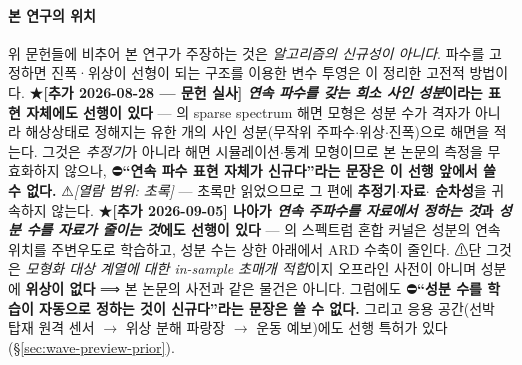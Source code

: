 \documentclass[11pt]{report}
\numberwithin{equation}{chapter}
\numberwithin{figure}{chapter}
\numberwithin{table}{chapter}
\begin{document}
\paragraph{본 연구의 위치}
위 문헌들에 비추어 본 연구가 주장하는 것은 \emph{알고리즘의 신규성이 아니다}.
파수를 고정하면 진폭·위상이 선형이 되는 구조를 이용한 변수 투영은
\citet{GolubPereyra2003}이 정리한 고전적 방법이다.
★\textbf{[추가 2026-08-28 --- 문헌 실사] \emph{연속 파수를 갖는 희소 사인 성분}이라는
표현 자체에도 선행이 있다} --- \citet{Charnotskii2011SparseSpectrum} 의 sparse spectrum
해면 모형은 성분 수가 격자가 아니라 해상상태로 정해지는 유한 개의 사인 성분(무작위
주파수$\cdot$위상$\cdot$진폭)으로 해면을 적는다. 그것은 \emph{추정기}가 아니라 해면
시뮬레이션$\cdot$통계 모형이므로 본 논문의 측정을 무효화하지 않으나,
⛔\textbf{``연속 파수 표현 자체가 신규다''라는 문장은 이 선행 앞에서 쓸 수 없다.}
⚠\emph{[열람 범위: 초록]} --- 초록만 읽었으므로 그 편에 \textbf{추정기$\cdot$자료$\cdot$
순차성}을 귀속하지 않는다.
★\textbf{[추가 2026-09-05] 나아가 \emph{연속 주파수를 자료에서 정하는 것}과
\emph{성분 수를 자료가 줄이는 것}에도 선행이 있다} --- \citet{WilsonAdams2013} 의 스펙트럼
혼합 커널은 성분의 연속 위치를 주변우도로 학습하고, 성분 수는 상한 아래에서 ARD 수축이
줄인다. ⚠단 그것은 \emph{모형화 대상 계열에 대한 in-sample 초매개 적합}이지 오프라인
사전이 아니며 성분에 \textbf{위상이 없다} ⟹ 본 논문의 사전과 같은 물건은 아니다.
그럼에도 ⛔\textbf{``성분 수를 학습이 자동으로 정하는 것이 신규다''라는 문장은 쓸 수 없다.}
그리고 응용 공간(선박 탑재 원격 센서 $\to$ 위상 분해 파랑장 $\to$ 운동 예보)에도 선행
특허가 있다(\S\ref{sec:wave-preview-prior}).
\end{document}
